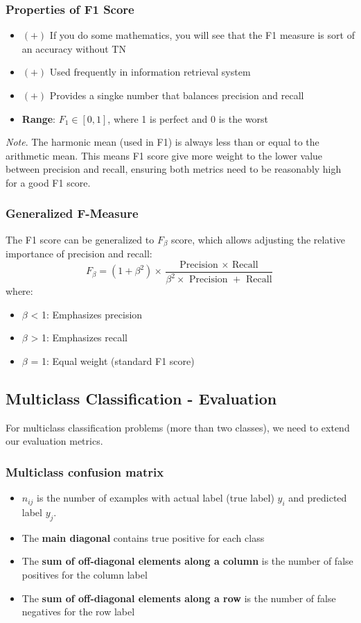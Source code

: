 \documentclass[a4paper]{article}
\theoremstyle{definition}
\begin{document}
\subsubsection{Properties of F1 Score}
\begin{itemize}
    \item \( (+) \) If you do some mathematics, you will see that the F1 measure is sort of an accuracy without TN
    \item \( (+) \) Used frequently in information retrieval system 
    \item \( (+) \) Provides a singke number that balances precision and recall 
    \item \textbf{Range}: \( F_1 \in [0,1] \), where 1 is perfect and 0 is the worst
\end{itemize}
\textit{Note}. The harmonic mean (used in F1) is always less than or equal to the arithmetic mean.
This means F1 score give more weight to the lower value between precision and recall, ensuring 
both metrics need to be reasonably high for a good F1 score.
\subsubsection{Generalized F-Measure}
The F1 score can be generalized to \( F_{\beta} \) score, which 
allows adjusting the relative importance of precision and recall:
\[
  F_{\beta} = (1 + \beta^2) \times \frac{\text{Precision }\times \text{ Recall}}{\beta^2 \times \text{ Precision } + \text{ Recall}}
\]
where:
\begin{itemize}
    \item \( \beta \) < 1: Emphasizes precision 
    \item \( \beta \) > 1: Emphasizes recall 
    \item \( \beta \) = 1: Equal weight (standard F1 score)
\end{itemize}
\subsection{Multiclass Classification - Evaluation}
For multiclass classification problems (more than two classes), we need 
to extend our evaluation metrics.
\subsubsection{Multiclass confusion matrix}
\begin{itemize}
    \item \( n_{ij} \) is the number of examples with actual label (true label) \( y_i \) and predicted label \( y_j \).
    \item The \textbf{main diagonal} contains true positive for each class 
    \item The \textbf{sum of off-diagonal elements along a column} is the number of false positives for the column label 
    \item The \textbf{sum of off-diagonal elements along a row} is the number of false negatives for the row label
\end{itemize} 
\end{document}
